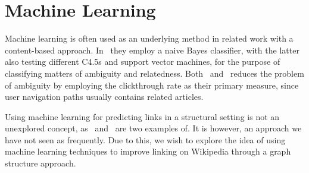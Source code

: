\section{Machine Learning}\label{related_machine_learning}

Machine learning is often used as an underlying method in related work with a content-based approach. In~\cite{mihalcea2007wikify,milne2008learning} they employ a naive Bayes classifier, with the latter also testing different C4.5s and support vector machines, for the purpose of classifying matters of ambiguity and relatedness. Both~\cite{hyperlink-structure-using-logs} and~\cite{west2015mining} reduces the problem of ambiguity by employing the clickthrough rate as their primary measure, since user navigation paths usually contains related articles. 

Using machine learning for predicting links in a structural setting is not an unexplored concept, as~\cite{tang2015line} and~\cite{al2006link} are two examples of. It is however, an approach we have not seen as frequently. Due to this, we wish to explore the idea of using machine learning techniques to improve linking on Wikipedia through a graph structure approach.


